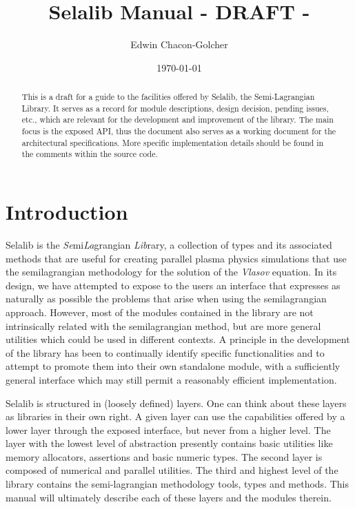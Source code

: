 \documentclass[]{report}   %
\begin{document}
\title{Selalib Manual - DRAFT -}
\author{Edwin Chacon-Golcher}        
\date{\today}    
\maketitle

\begin{abstract}
 This is a draft for a guide to the facilities offered by Selalib, the Semi-Lagrangian Library. It serves as a record for module descriptions, design decision, pending issues, etc., which are relevant for the development and improvement of the library. The main focus is the exposed API, thus the document also serves as a working document for the architectural specifications. More specific implementation details should be found in the comments within the source code. 
\end{abstract}

\tableofcontents

\chapter{Introduction}             %
Selalib is the \emph{Se}mi\emph{La}grangian \emph{Lib}rary, a collection of types and its associated methods that are useful for creating parallel plasma physics simulations that use the semilagrangian methodology for the solution of the \emph{Vlasov} equation. In its design, we have attempted to expose to the users an interface that expresses as naturally as possible the problems that arise when using the semilagrangian approach. However, most of the modules contained in the library are not intrinsically related with the semilagrangian method, but are more general utilities which could be used in different contexts. A principle in the development of the library has been to continually identify specific functionalities and to attempt to promote them into their own standalone module, with a sufficiently general interface which may still permit a reasonably efficient implementation.

Selalib is structured in (loosely defined) layers. One can think about these layers as libraries in their own right. A given layer can use the capabilities offered by a lower layer through the exposed interface, but never from a higher level. The layer with the lowest level of abstraction presently contains basic utilities like memory allocators, assertions and basic numeric types. The second layer is composed of numerical and parallel utilities. The third and highest level of the library contains the semi-lagrangian methodology tools, types and methods. This manual will ultimately describe each of these layers and the modules therein.
\end{document}
